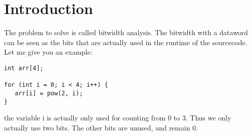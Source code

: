 \chapter{Introduction}\label{sec:intro}


The problem to solve is called bitwidth analysis.
The bitwidth with a dataword can be seen as the bits that are actually used in the runtime of the sourcecode.
Let me give you an example:
\begin{lstlisting}[frame=single]
int arr[4];

for (int i = 0; i < 4; i++) {
   arr[i] = pow(2, i);
}
\end{lstlisting}
the variable i is actually only used for counting from 0 to 3.
Thus we only actually use two bits. The other bits are unused, and remain 0.


